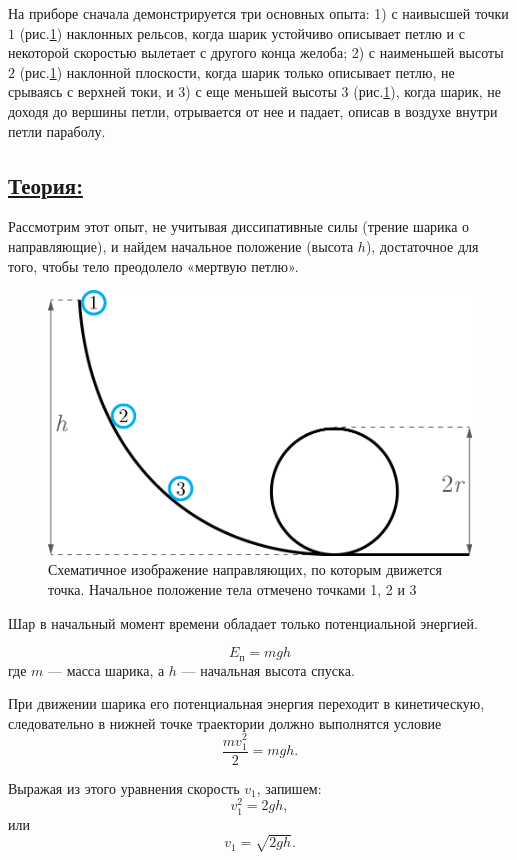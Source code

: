 \documentclass[14pt,a4paper,oneside]{extarticle}	%
\begin{document}
На приборе сначала демонстрируется три основных опыта: 1) с наивысшей точки $ 1 $ (рис.\ref{loop-2}) наклонных рельсов, когда шарик устойчиво описывает петлю и с некоторой скоростью вылетает с другого конца желоба; 2) с наименьшей высоты $ 2 $ (рис.\ref{loop-2}) наклонной плоскости, когда шарик только описывает петлю, не срываясь с верхней токи, и 3) с еще меньшей высоты $ 3 $ (рис.\ref{loop-2}), когда шарик, не доходя до вершины петли, отрывается от нее и падает, описав в воздухе внутри петли параболу.

\newpage
\subsection*{\underline{Теория:}}

Рассмотрим этот опыт, не учитывая диссипативные силы (трение шарика о направляющие), и найдем начальное положение (высота $ h $), достаточное для того, чтобы тело преодолело «мертвую петлю».  

\begin{figure}[H] 
	\centering 	
	\includegraphics[width=0.5\linewidth]{loop-2.png}
	\caption{Схематичное изображение направляющих, по которым движется точка. Начальное положение тела отмечено точками 1, 2 и 3}
	\label{loop-2}
\end{figure}

Шар в начальный момент времени обладает только потенциальной энергией. 
  
\begin{equation}\label{loop-eq1}
E_{\text{п}} = mgh
\end{equation}
 где $ m $ — масса шарика, а $ h $ — начальная высота спуска.
 
При движении шарика его потенциальная энергия переходит в кинетическую, следовательно в нижней точке траектории должно выполнятся условие 
\begin{equation}\label{loop-eq2}
\frac{mv_{1}^{2}}{2} = mgh.
\end{equation}

Выражая из этого уравнения скорость $ v_{1} $, запишем:
\begin{equation}\label{loop-eq3}
v_{1}^{2} = 2gh,
\end{equation}
или
\begin{equation}\label{loop-eq4}
v_{1} = \sqrt{2gh}.
\end{equation}
\end{document}
